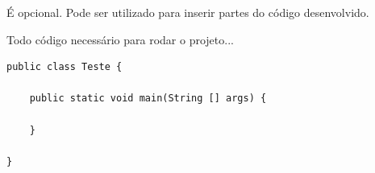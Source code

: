 
É opcional. Pode ser utilizado para inserir partes do código desenvolvido.

Todo código necessário para rodar o projeto...

\begin{lstlisting}[]
public class Teste {
 
 	public static void main(String [] args) {
 	
 	}

}
\end{lstlisting}
